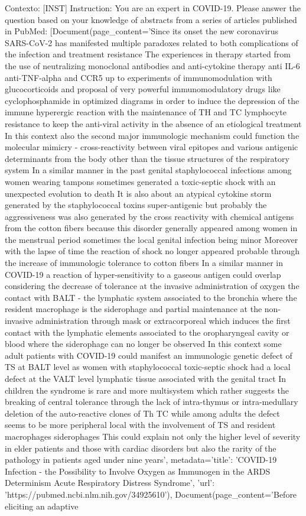 Contexto: [INST] Instruction: You are an expert in COVID-19. Please answer the question based on your knowledge of abstracts from a series of articles published in PubMed:
[Document(page\_content='Since its onset the new coronavirus SARS-CoV-2 has manifested multiple paradoxes related to both complications of the infection and treatment resistance The experiences in therapy started from the use of neutralizing monoclonal antibodies and anti-cytokine therapy anti IL-6 anti-TNF-alpha and CCR5 up to experiments of immunomodulation with glucocorticoids and proposal of very powerful immunomodulatory drugs like cyclophosphamide in optimized diagrams in order to induce the depression of the immune hyperergic reaction with the maintenance of TH and TC lymphocyte resistance to keep the anti-viral activity in the absence of an etiological treatment In this context also the second major immunologic mechanism could function the molecular mimicry - cross-reactivity between viral epitopes and various antigenic determinants from the body other than the tissue structures of the respiratory system In a similar manner in the past genital staphylococcal infections among women wearing tampons sometimes generated a toxic-septic shock with an unexpected evolution to death It is also about an atypical cytokine storm generated by the staphylococcal toxins super-antigenic but probably the aggressiveness was also generated by the cross reactivity with chemical antigens from the cotton fibers because this disorder generally appeared among women in the menstrual period sometimes the local genital infection being minor Moreover with the lapse of time the reaction of shock no longer appeared probable through the increase of immunologic tolerance to cotton fibers In a similar manner in COVID-19 a reaction of hyper-sensitivity to a gaseous antigen could overlap considering the decrease of tolerance at the invasive administration of oxygen the contact with BALT - the lymphatic system associated to the bronchia where the resident macrophage is the siderophage and partial maintenance at the non-invasive administration through mask or extracorporeal which induces the first contact with the lymphatic elements associated to the oropharyngeal cavity or blood where the siderophage can no longer be observed In this context some adult patients with COVID-19 could manifest an immunologic genetic defect of TS at BALT level as women with staphylococcal toxic-septic shock had a local defect at the VALT level lymphatic tissue associated with the genital tract In children the syndrome is rare and more multisystem which rather suggests the breaking of central tolerance through the lack of intra-thymus or intra-medullary deletion of the auto-reactive clones of Th TC while among adults the defect seems to be more peripheral local with the involvement of TS and resident macrophages siderophages This could explain not only the higher level of severity in elder patients and those with cardiac disorders but also the rarity of the pathology in patients aged under nine years', metadata={'title': 'COVID-19 Infection - the Possibility to Involve Oxygen as Immunogen in the ARDS Determinism Acute Respiratory Distress Syndrome', 'url': 'https://pubmed.ncbi.nlm.nih.gov/34925610'}), Document(page\_content='Before eliciting an adaptive 